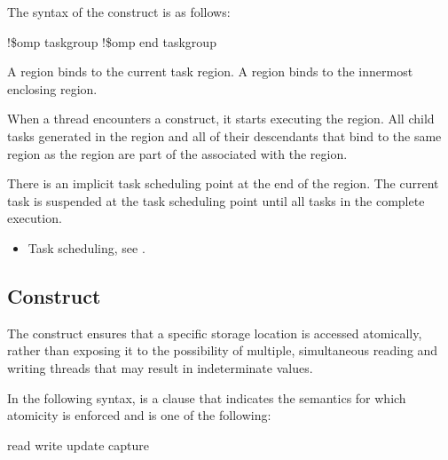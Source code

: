 {{{{\fortranspecificstart
The syntax of the  construct is as follows:

\begin{boxedcode}
!\$omp taskgroup
!\$omp end taskgroup
\end{boxedcode}
\fortranspecificend

\binding
A  region binds to the current task region. A  region binds to 
the innermost enclosing  region. 

\descr
When a thread encounters a  construct, it starts executing 
the region. All child tasks generated in the  region and all 
of their descendants that bind to the same  region as the 
 region are part of the  associated with 
the  region.

There is an implicit task scheduling point at the end of the  
region. The current task is suspended at the task scheduling point until all 
tasks in the  complete execution.

\crossreferences
\begin{itemize}
\item Task scheduling, see 
.
\end{itemize}










\subsection{ Construct}
\label{subsec:atomic Construct}
\summary
The  construct ensures that a specific storage location is accessed atomically, 
rather than exposing it to the possibility of multiple, simultaneous reading and writing 
threads that may result in indeterminate values.

\syntax
In the following syntax,  is a clause that indicates
the semantics for which atomicity is enforced and is one of the following:

\begin{indentedcodelist}
read
write
update
capture
\end{indentedcodelist}

}}}}
